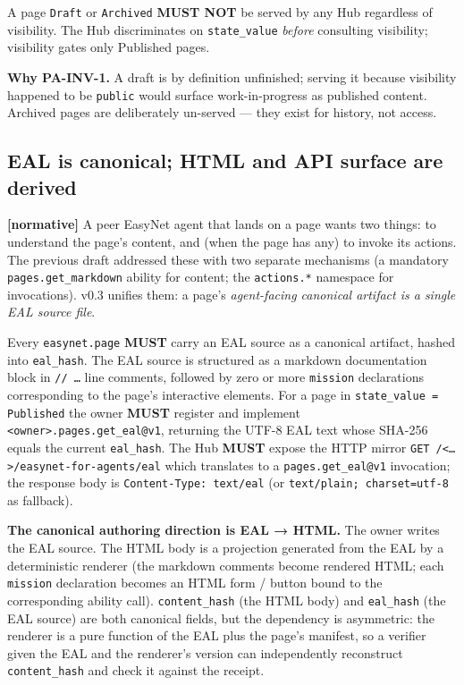 \documentclass[11pt,a4paper]{article}
\newcommand{\normsv}{\textcolor{normativecolor}{\textbf{[normative]}}\xspace}
\theoremstyle{definition}
\begin{document}
\begin{invariant}[PA-INV-1]
A page \texttt{Draft} or \texttt{Archived} \textbf{MUST NOT} be
served by any Hub regardless of visibility. The Hub
discriminates on \texttt{state\_value} \emph{before} consulting
visibility; visibility gates only Published pages.
\end{invariant}

\textbf{Why PA-INV-1.} A draft is by definition unfinished; serving
it because visibility happened to be \texttt{public} would surface
work-in-progress as published content. Archived pages are
deliberately un-served --- they exist for history, not access.

\subsection{EAL is canonical; HTML and API surface are derived}
\label{sec:eal-canonical}

\normsv{} A peer EasyNet agent that lands on a page wants two
things: to understand the page's content, and (when the page
has any) to invoke its actions. The previous draft addressed
these with two separate mechanisms (a mandatory
\texttt{pages.get\_markdown} ability for content; the
\texttt{actions.*} namespace for invocations). v0.3 unifies
them: a page's \emph{agent-facing canonical artifact is a
single EAL source file}.

\begin{invariant}[PA-INV-2]
Every \texttt{easynet.page} \textbf{MUST} carry an EAL source
as a canonical artifact, hashed into \texttt{eal\_hash}. The
EAL source is structured as a markdown documentation block in
\texttt{// \ldots} line comments, followed by zero or more
\texttt{mission} declarations corresponding to the page's
interactive elements. For a page in \texttt{state\_value =
Published} the owner \textbf{MUST} register and implement
\texttt{<owner>.pages.get\_eal@v1}, returning the UTF-8 EAL
text whose SHA-256 equals the current \texttt{eal\_hash}. The
Hub \textbf{MUST} expose the HTTP mirror
\texttt{GET /<\ldots>/easynet-for-agents/eal} which translates
to a \texttt{pages.get\_eal@v1} invocation; the response body
is \texttt{Content-Type: text/eal} (or
\texttt{text/plain; charset=utf-8} as fallback).
\end{invariant}

\textbf{The canonical authoring direction is EAL → HTML.} The
owner writes the EAL source. The HTML body is a projection
generated from the EAL by a deterministic renderer (the markdown
comments become rendered HTML; each \texttt{mission} declaration
becomes an HTML form / button bound to the corresponding ability
call). \texttt{content\_hash} (the HTML body) and
\texttt{eal\_hash} (the EAL source) are both canonical fields,
but the dependency is asymmetric: the renderer is a pure
function of the EAL plus the page's manifest, so a verifier
given the EAL and the renderer's version can independently
reconstruct \texttt{content\_hash} and check it against the
receipt.
\end{document}
